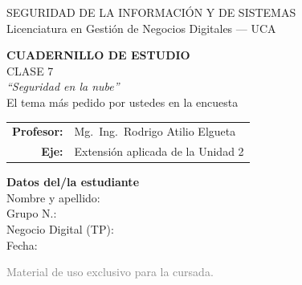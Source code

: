 \documentclass[12pt,a4paper]{article}
\begin{document}
\begin{titlepage}
\centering
\vspace*{1cm}

\begin{cajaTitulo}[width=\textwidth, halign=center]
  SEGURIDAD DE LA INFORMACI\'ON Y DE SISTEMAS\\[4pt]
  {\large Licenciatura en Gesti\'on de Negocios Digitales --- UCA}
\end{cajaTitulo}

\vspace{1.5cm}

{\Huge\bfseries\color{azulUCA} CUADERNILLO DE ESTUDIO}\\[8pt]
{\LARGE\color{doradoUCA} CLASE 7}\\[12pt]
{\Large\itshape ``Seguridad en la nube''}\\[6pt]
{\large\color{azulNube}\; El tema m\'as pedido por ustedes en la encuesta}\\[1.5cm]

\begin{tabular}{rl}
\textbf{Profesor:}   & Mg.\ Ing.\ Rodrigo Atilio Elgueta \\[4pt]
\textbf{Eje:}        & Extensi\'on aplicada de la Unidad 2 \\[4pt]
\end{tabular}

\vfill

\begin{tcolorbox}[colback=grisClaro, colframe=azulUCA, arc=3mm, width=0.9\textwidth]
  \centering
  {\bfseries Datos del/la estudiante}\\[10pt]
  Nombre y apellido: \underline{\hspace{5cm}}\\[10pt]
  Grupo N.\textdegree: \underline{\hspace{5cm}}\\[10pt]
  Negocio Digital (TP): \underline{\hspace{5cm}}\\[10pt]
  Fecha: \underline{\hspace{5cm}}
\end{tcolorbox}

\vspace{1cm}
{\small\textcolor{gray}{Material de uso exclusivo para la cursada.}}
\end{titlepage}
\end{document}
